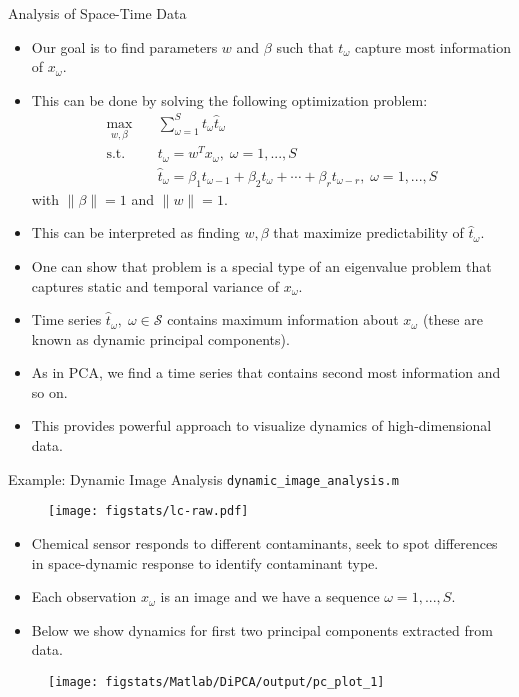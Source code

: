 \documentclass[handout,9pt]{beamer}
\begin{document}
%
\begin{frame}{Analysis of Space-Time Data}

\begin{itemize}
\setlength{\itemsep}{5pt}
\item Our goal is to find parameters $w$ and $\beta$ such that $t_\omega$ capture most information of $x_\omega$.
\item This can be done by solving the following optimization problem:
\begin{align*}
\max_{w,\beta}& \quad \sum_{\omega=1}^{S}t_\omega\hat{t}_\omega\\
\textrm{s.t.}& \quad t_\omega=w^Tx_\omega,\; \omega=1,...,S\\
& \quad \hat{t}_\omega=\beta_1t_{\omega-1}+\beta_2t_{\omega}+\cdots+\beta_rt_{\omega-r},\; \omega=1,...,S
\end{align*}
with $\|\beta\|=1$ and $\|w\|=1$. 
\item This can be interpreted as finding $w,\beta$ that maximize predictability of $\hat{t}_\omega$. 
\item One can show that problem is a special type of an eigenvalue problem that captures static and temporal variance of $x_\omega$. 
\item Time series $\hat{t}_\omega,\; \omega\in\mathcal{S}$ contains maximum information about $x_\omega$ (these are known as dynamic principal components).
\item As in PCA, we find a time series that contains second most information and so on.
\item This provides powerful approach to visualize dynamics of high-dimensional data. 
\end{itemize}

\end{frame}

\begin{frame}{Example: Dynamic Image Analysis \footnotesize{\texttt{dynamic\_image\_analysis.m}}}
\begin{figure}[!htb]
    \centering
  \texttt{[image: figstats/lc-raw.pdf]}
  \end{figure}
  \vspace{-0.1in}
  \begin{itemize}
  \setlength{\itemsep}{5pt}
  \item Chemical sensor responds to different contaminants, seek to spot differences in space-dynamic response to identify contaminant type.
  \item Each observation $x_\omega$ is an image and we have a sequence $\omega=1,...,S$.
  \item Below we show dynamics for first two principal components extracted from data.
  \end{itemize}
\begin{figure}[!htb]
    \centering
    \texttt{[image: figstats/Matlab/DiPCA/output/pc\_plot\_1]}
    \end{figure}
\end{frame}
\end{document}
